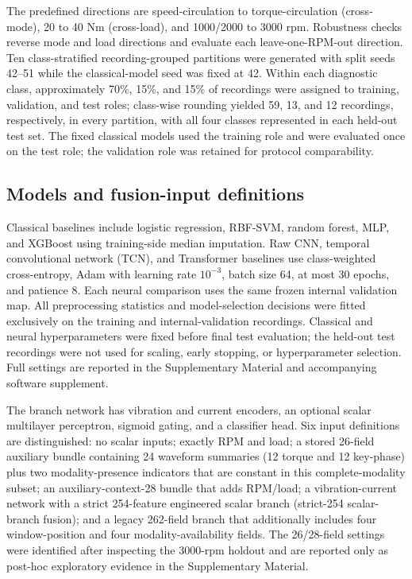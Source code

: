 \documentclass[machines,article,submit,oneauthor]{Definitions/mdpi}
\begin{document}
The predefined directions are speed-circulation to torque-circulation (cross-mode), 20 to 40 Nm (cross-load), and 1000/2000 to 3000 rpm. Robustness checks reverse mode and load directions and evaluate each leave-one-RPM-out direction. Ten class-stratified recording-grouped partitions were generated with split seeds 42--51 while the classical-model seed was fixed at 42. Within each diagnostic class, approximately 70\%, 15\%, and 15\% of recordings were assigned to training, validation, and test roles; class-wise rounding yielded 59, 13, and 12 recordings, respectively, in every partition, with all four classes represented in each held-out test set. The fixed classical models used the training role and were evaluated once on the test role; the validation role was retained for protocol comparability.

\subsection{Models and fusion-input definitions}
Classical baselines include logistic regression, RBF-SVM, random forest, MLP, and XGBoost using training-side median imputation. Raw CNN, temporal convolutional network (TCN), and Transformer baselines use class-weighted cross-entropy, Adam with learning rate $10^{-3}$, batch size 64, at most 30 epochs, and patience 8. Each neural comparison uses the same frozen internal validation map. All preprocessing statistics and model-selection decisions were fitted exclusively on the training and internal-validation recordings. Classical and neural hyperparameters were fixed before final test evaluation; the held-out test recordings were not used for scaling, early stopping, or hyperparameter selection. Full settings are reported in the Supplementary Material and accompanying software supplement.

The branch network has vibration and current encoders, an optional scalar multilayer perceptron, sigmoid gating, and a classifier head. Six input definitions are distinguished: no scalar inputs; exactly RPM and load; a stored 26-field auxiliary bundle containing 24 waveform summaries (12 torque and 12 key-phase) plus two modality-presence indicators that are constant in this complete-modality subset; an auxiliary-context-28 bundle that adds RPM/load; a vibration-current network with a strict 254-feature engineered scalar branch (strict-254 scalar-branch fusion); and a legacy 262-field branch that additionally includes four window-position and four modality-availability fields. The 26/28-field settings were identified after inspecting the 3000-rpm holdout and are reported only as post-hoc exploratory evidence in the Supplementary Material.
\end{document}
